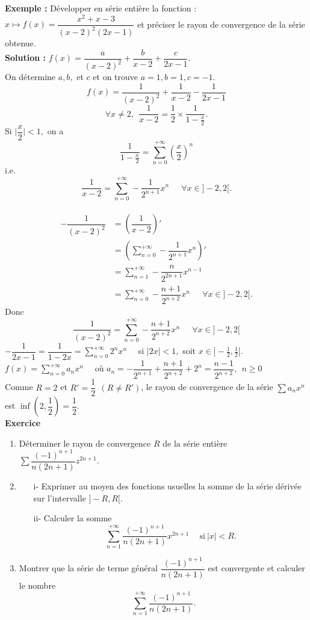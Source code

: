 \documentclass[11pt, a4paper]{book}
\begin{document}
\textbf{Exemple : }\quad D\'evelopper en s\'erie enti\`ere la fonction : $x\mapsto f(x)=\dfrac{x^2+x-3}{(x-2)^2(2x-1)}$ et pr\'eciser le rayon de convergence de la s\'erie obtenue.\\
\textbf{Solution :} \quad
$f(x)=\dfrac{a}{(x-2)^2}+\dfrac{b}{x-2}+\dfrac{c}{2x-1}.$ \\
On d\'etermine $a,b,$ et $c$ et on trouve $a=1,b=1,c=-1.$
$$f(x)=\dfrac{1}{(x-2)^2}+\dfrac{1}{x-2}-\dfrac{1}{2x-1}$$ $$\forall x\neq2,~~\dfrac{1}{x-2}=\dfrac{1}{2}\times\dfrac{1}{1-\frac{x}{2}}.$$
Si $\Big|\dfrac{x}{2}\Big|<1,$ on a $$\dfrac{1}{1-\frac{x}{2}}=\sum_{n=0}^{+\infty}\left(\dfrac{x}{2}\right)^n$$ 
i.e. $$\dfrac{1}{x-2}=\sum_{n=0}^{+\infty}-\dfrac{1}{2^{n+1}}x^n\quad~~\forall x\in ]-2,2[.$$\\
\begin{align*}
-\dfrac{1}{(x-2)^2}&=\left(\dfrac{1}{x-2}\right)'\\
&=\left( \sum_{n=0}^{+\infty}-\dfrac{1}{2^{n+1}}x^n\right)'\\
&=\sum_{n=1}^{+\infty}-\dfrac{n}{2^{2n+1}}x^{n-1}\\
&=\sum_{n=0}^{+\infty}-\dfrac{n+1}{2^{n+2}}x^n \quad~~\forall x\in ]-2,2[.
\end{align*}
Donc $$\dfrac{1}{(x-2)^2}=\sum_{n=0}^{+\infty}-\dfrac{n+1}{2^{n+2}}x^n \quad~~\forall x\in ]-2,2[$$
${\displaystyle -\dfrac{1}{2x-1}=\dfrac{1}{1-2x}=\sum_{n=0}^{+\infty}2^nx^n}\quad$ si $|2x|<1,$ soit $x\in ]-\frac{1}{2},\frac{1}{2}[.$\\
${\displaystyle f(x)=\sum_{n=0}^{+\infty}a_nx^n}\quad$ o\`u $a_n=-\dfrac{1}{2^{n+1}}+\dfrac{n+1}{2^{n+2}}+2^n=\dfrac{n-1}{2^{n+2}},~~n\geq0$\\
Comme $R=2$ et $R'=\dfrac{1}{2}~~(R\neq R')$, le rayon de convergence de la s\'erie $\sum a_nx^n$ est $\inf\left(2,\dfrac{1}{2}\right)=\dfrac{1}{2}.$\\
\textbf{Exercice}\quad
\begin{enumerate}
\item D\'eterminer le rayon de convergence $R$ de la s\'erie enti\`ere $\sum \dfrac{(-1)^{n+1}}{n(2n+1)}z^{2n+1}.$
\item \begin{itemize}
\item[i-] Exprimer au moyen des fonctions usuelles la somme de la s\'erie d\'eriv\'ee sur l'intervalle $]-R,R[.$
\item[ii-] Calculer la somme $$\sum_{n=1}^{+\infty}\dfrac{(-1)^{n+1}}{n(2n+1)}x^{2n+1}\quad~\text{si}~|x|<R.$$
\end{itemize} 
\item Montrer que la s\'erie de terme g\'en\'eral $\dfrac{(-1)^{n+1}}{n(2n+1)}$ est convergente et calculer le nombre $$\sum_{n=1}^{+\infty}\dfrac{(-1)^{n+1}}{n(2n+1)}.$$
\end{enumerate}
\end{document}
